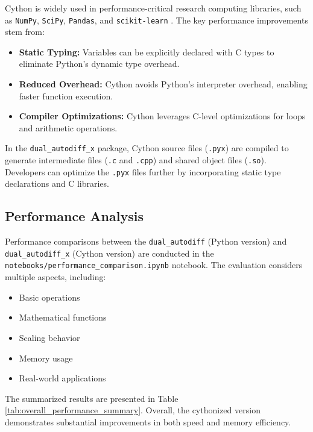 \documentclass{article}
\begin{document}
Cython is widely used in performance-critical research computing libraries, such as \texttt{NumPy}, \texttt{SciPy}, \texttt{Pandas}, and \texttt{scikit-learn} \cite{researchcomputing_notebook}. The key performance improvements stem from:

\begin{itemize} 
    \item \textbf{Static Typing:} Variables can be explicitly declared with C types to eliminate Python's dynamic type overhead. 
    \item \textbf{Reduced Overhead:} Cython avoids Python's interpreter overhead, enabling faster function execution. 
    \item \textbf{Compiler Optimizations:} Cython leverages C-level optimizations for loops and arithmetic operations. 
\end{itemize}

In the \texttt{dual\_autodiff\_x} package, Cython source files (\texttt{.pyx}) are compiled to generate intermediate files (\texttt{.c} and \texttt{.cpp}) and shared object files (\texttt{.so}). Developers can optimize the \texttt{.pyx} files further by incorporating static type declarations and C libraries.

\subsection{Performance Analysis}

Performance comparisons between the \texttt{dual\_autodiff} (Python version) and \texttt{dual\_autodiff\_x} (Cython version) are conducted in the \texttt{notebooks/performance\_comparison.ipynb} notebook. The evaluation considers multiple aspects, including:

\begin{itemize} \item Basic operations \item Mathematical functions \item Scaling behavior \item Memory usage \item Real-world applications \end{itemize}

The summarized results are presented in Table \ref{tab:overall_performance_summary}. Overall, the cythonized version demonstrates substantial improvements in both speed and memory efficiency.
\end{document}
